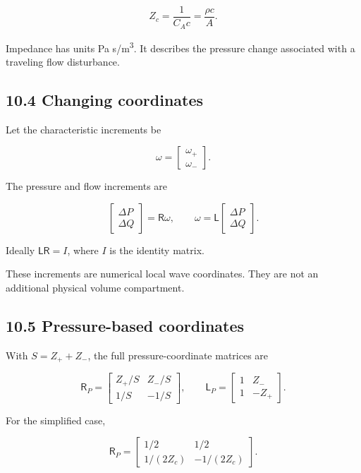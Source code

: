 \documentclass[11pt,a4paper]{article}
\begin{document}
\begingroup\small
\[
Z_c=\frac1{C_Ac}=\frac{\rho c}{A}.
\]
\endgroup


Impedance has units Pa s/m\textsuperscript{3}. It describes the pressure change associated with a traveling flow disturbance.

\subsection{10.4 Changing coordinates}
Let the characteristic increments be


\begingroup\small
\[
\omega=
\begin{bmatrix}\omega_+\\\omega_-\end{bmatrix}.
\]
\endgroup


The pressure and flow increments are


\begingroup\small
\[
\begin{bmatrix}\Delta P\\\Delta Q\end{bmatrix}
=\mathsf R\omega,
\qquad
\omega=\mathsf L
\begin{bmatrix}\Delta P\\\Delta Q\end{bmatrix}.
\]
\endgroup


Ideally \(\mathsf L\mathsf R=I\), where \(I\) is the identity matrix.

These increments are numerical local wave coordinates. They are not an additional physical volume compartment.

\subsection{10.5 Pressure-based coordinates}
With \(S=Z_++Z_-\), the full pressure-coordinate matrices are


\begingroup\small
\[
\mathsf R_P=
\begin{bmatrix}
Z_+/S&Z_-/S\\
1/S&-1/S
\end{bmatrix},
\qquad
\mathsf L_P=
\begin{bmatrix}
1&Z_-\\
1&-Z_+
\end{bmatrix}.
\]
\endgroup


For the simplified case,


\begingroup\small
\[
\mathsf R_P=
\begin{bmatrix}
1/2&1/2\\
1/(2Z_c)&-1/(2Z_c)
\end{bmatrix}.
\]
\endgroup
\end{document}
